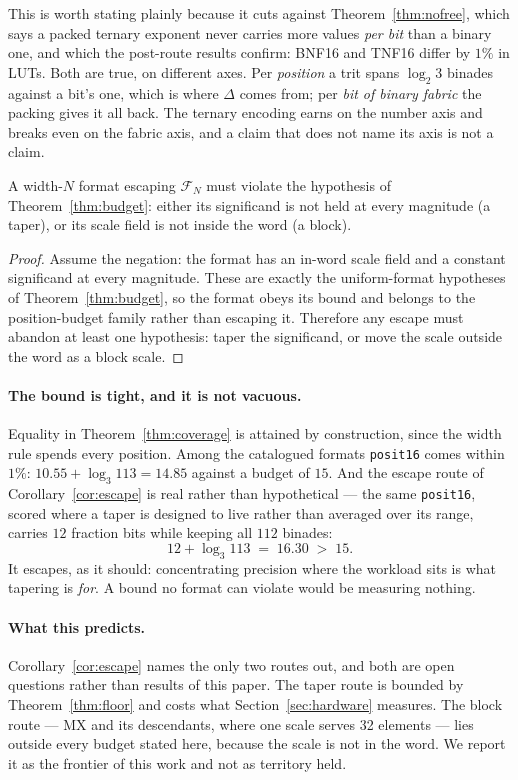 This is worth stating plainly because it cuts against
Theorem~\ref{thm:nofree}, which says a packed ternary exponent never carries
more values \emph{per bit} than a binary one, and which the post-route results
confirm:
BNF16 and TNF16 differ by $1\%$ in LUTs. Both are true, on different axes. Per
\emph{position} a trit spans $\log_2 3$ binades against a bit's one, which is
where $\Delta$ comes from; per \emph{bit of binary fabric} the packing gives it
all back. The ternary encoding earns on the number axis and breaks even on the
fabric axis, and a claim that does not name its axis is not a claim.

\begin{corollary}
\label{cor:escape}
A width-$N$ format escaping $\mathcal{F}_N$ must violate the hypothesis of
Theorem~\ref{thm:budget}: either its significand is not held at every magnitude
(a taper), or its scale field is not inside the word (a block).
\end{corollary}
\begin{proof}
Assume the negation: the format has an in-word scale field and a constant
significand at every magnitude.  These are exactly the uniform-format
hypotheses of Theorem~\ref{thm:budget}, so the format obeys its bound and
belongs to the position-budget family rather than escaping it.  Therefore any
escape must abandon at least one hypothesis: taper the significand, or move the
scale outside the word as a block scale.
\end{proof}

\paragraph{The bound is tight, and it is not vacuous.} Equality in
Theorem~\ref{thm:coverage} is attained by construction, since the width rule
spends every position. Among the catalogued formats \texttt{posit16} comes within
$1\%$: $10.55 + \log_3 113 = 14.85$ against a budget of $15$. And the escape route
of Corollary~\ref{cor:escape} is real rather than hypothetical --- the same
\texttt{posit16}, scored where a taper is designed to live rather than averaged
over its range, carries $12$ fraction bits while keeping all $112$ binades:
\[
  12 + \log_3 113 \;=\; 16.30 \;>\; 15 .
\]
It escapes, as it should: concentrating precision where the workload sits is what
tapering is \emph{for}. A bound no format can violate would be measuring nothing.

\paragraph{What this predicts.} Corollary~\ref{cor:escape} names the only two
routes out, and both are open questions rather than results of this paper. The
taper route is bounded by Theorem~\ref{thm:floor} and costs what
Section~\ref{sec:hardware} measures. The block route --- MX and its descendants,
where one scale serves 32 elements --- lies outside every budget stated here,
because the scale is not in the word. We report it as the frontier of this work
and not as territory held.




